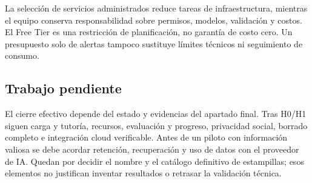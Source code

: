 La selección de servicios administrados reduce tareas de infraestructura, mientras el equipo conserva responsabilidad sobre permisos, modelos, validación y costos. El Free Tier es una restricción de planificación, no garantía de costo cero. Un presupuesto solo de alertas tampoco sustituye límites técnicos ni seguimiento de consumo.

\subsection{Trabajo pendiente}
El cierre efectivo depende del estado y evidencias del apartado final. Tras H0/H1 siguen carga y tutoría, recursos, evaluación y progreso, privacidad social, borrado completo e integración cloud verificable. Antes de un piloto con información valiosa se debe acordar retención, recuperación y uso de datos con el proveedor de IA. Quedan por decidir el nombre y el catálogo definitivo de estampillas; esos elementos no justifican inventar resultados o retrasar la validación técnica.
